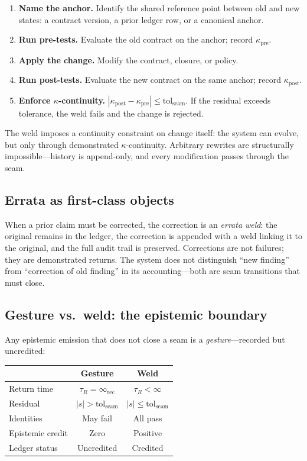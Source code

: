 \documentclass[
  aps,
  prd,
  twocolumn,
  superscriptaddress,
  nofootinbib,
  floatfix
]{revtex4-2}
\newcommand{\tR}{\tau_{\!R}}
\newcommand{\IR}{\infty_{\mathrm{rec}}}
\newcommand{\tolseam}{\mathrm{tol}_{\mathrm{seam}}}
\begin{document}
\begin{enumerate}[leftmargin=*,label=(\arabic*)]
\item \textbf{Name the anchor.}  Identify the shared reference
  point between old and new states: a contract version, a prior
  ledger row, or a canonical anchor.
\item \textbf{Run pre-tests.}  Evaluate the old contract on the
  anchor; record $\kappa_\mathrm{pre}$.
\item \textbf{Apply the change.}  Modify the contract, closure,
  or policy.
\item \textbf{Run post-tests.}  Evaluate the new contract on the
  same anchor; record $\kappa_\mathrm{post}$.
\item \textbf{Enforce $\kappa$-continuity.}
  $|\kappa_\mathrm{post} - \kappa_\mathrm{pre}| \leq \tolseam$.
  If the residual exceeds tolerance, the weld fails and the change
  is rejected.
\end{enumerate}

\noindent The weld imposes a continuity constraint on change
itself: the system can evolve, but only through demonstrated
$\kappa$-continuity.  Arbitrary rewrites are structurally
impossible---history is append-only, and every modification passes
through the seam.

\subsection{Errata as first-class objects}

When a prior claim must be corrected, the correction is an
\emph{errata weld}: the original remains in the ledger, the
correction is appended with a weld linking it to the original,
and the full audit trail is preserved.  Corrections are not
failures; they are demonstrated returns.  The system does not
distinguish ``new finding'' from ``correction of old finding'' in
its accounting---both are seam transitions that must close.

\subsection{Gesture vs.\ weld: the epistemic boundary}

Any epistemic emission that does not close a seam is a
\emph{gesture}---recorded but uncredited:

\begin{center}
{\small\begin{tabular}{@{}lcc@{}}
\toprule
& \textbf{Gesture} & \textbf{Weld} \\
\midrule
Return time & $\tR = \IR$ & $\tR < \infty$ \\
Residual & $|s| > \tolseam$ & $|s| \leq \tolseam$ \\
Identities & May fail & All pass \\
Epistemic credit & Zero & Positive \\
Ledger status & Uncredited & Credited \\
\bottomrule
\end{tabular}}
\end{center}
\end{document}
